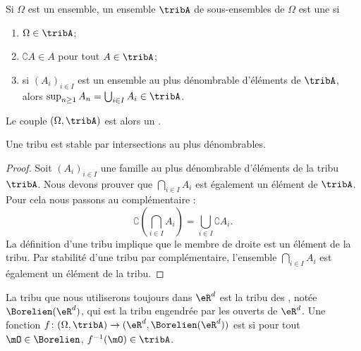 \begin{definition}
    Si \( \Omega\) est un ensemble, un ensemble \( \tribA\) de sous-ensembles de \( \Omega\) est une  si
    \begin{enumerate}
        \item
            \( \Omega\in\tribA\);
        \item
            \( \complement A\in A\) pour tout \( A\in\tribA\);
        \item
            si \( (A_i)_{i\in I}\) est un ensemble au plus dénombrable d'éléments de \( \tribA\), alors \( \sup_{n\geq 1}A_n=\bigcup_{i\in I}A_i\in\tribA\).
    \end{enumerate}
    Le couple \( (\Omega,\tribA)\) est alors un .
\end{definition}

\begin{lemma}
    Une tribu est stable par intersections au plus dénombrables.
\end{lemma}

\begin{proof}
    Soit \( (A_i)_{i\in I}\) une famille au plus dénombrable d'éléments de la tribu \( \tribA\). Nous devons prouver que \( \bigcap_{i\in I}A_i\) est également un élément de \( \tribA\). Pour cela nous passons au complémentaire :
    \begin{equation}
        \complement\left( \bigcap_{i\in I}A_i \right)=\bigcup_{i\in I}\complement A_i.
    \end{equation}
    La définition d'une tribu implique que le membre de droite est un élément de la tribu. Par stabilité d'une tribu par complémentaire, l'ensemble \( \bigcap_{i\in I}A_i\) est également un élément de la tribu.
\end{proof}

La tribu que nous utiliserons toujours dans \( \eR^d\) est la tribu des , notée \( \Borelien(\eR^d)\), qui est la tribu engendrée par les ouverts de \( \eR^d\). Une fonction \( f\colon (\Omega,\tribA)\to (\eR^d,\Borelien(\eR^d))\) est  si pour tout \( \mO\in\Borelien\), \( f^{-1}(\mO)\in\tribA\).

